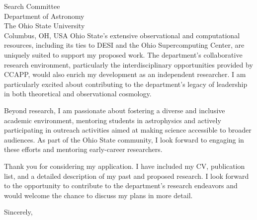 \documentclass[11pt]{letter}
\begin{document}
\begin{letter}{Search Committee \\ Department of Astronomy \\ The Ohio State University \\ Columbus, OH, USA}
Ohio State's extensive observational and computational resources, including its ties to DESI and the Ohio Supercomputing Center, are uniquely suited to support my proposed work. The department's collaborative research environment, particularly the interdisciplinary opportunities provided by CCAPP, would also enrich my development as an independent researcher. I am particularly excited about contributing to the department's legacy of leadership in both theoretical and observational cosmology.

Beyond research, I am passionate about fostering a diverse and inclusive academic environment, mentoring students in astrophysics and actively participating in outreach activities aimed at making science accessible to broader audiences. As part of the Ohio State community, I look forward to engaging in these efforts and mentoring early-career researchers.

Thank you for considering my application. I have included my CV, publication list, and a detailed description of my past and proposed research. I look forward to the opportunity to contribute to the department's research endeavors and would welcome the chance to discuss my plans in more detail.

\closing{Sincerely,}

\end{letter}
\end{document}
